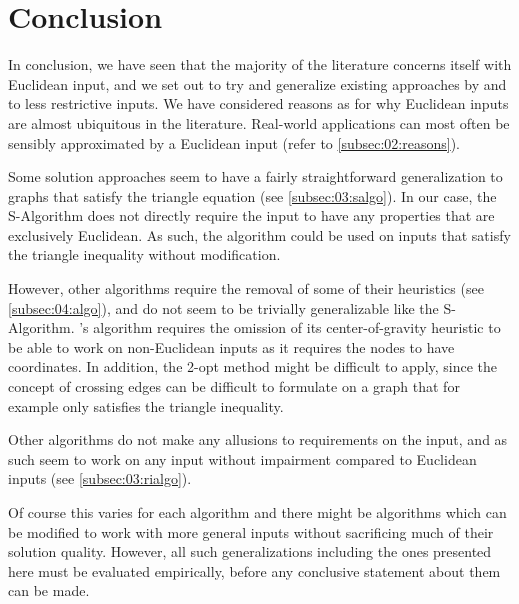 \section{Conclusion}

In conclusion, we have seen that the majority of the literature concerns itself with Euclidean input,
and we set out to try and generalize existing approaches by \citeauthor{tsiligiridis_heuristic_1984} \cite{tsiligiridis_heuristic_1984} and \citeauthor{szwarc_novel_2022} \cite{szwarc_novel_2022} to less restrictive inputs.
We have considered reasons as for why Euclidean inputs are almost ubiquitous in the literature.
Real-world applications can most often be sensibly approximated by a Euclidean input (refer to \cref{subsec:02:reasons}).

Some solution approaches seem to have a fairly straightforward generalization to graphs that satisfy the triangle equation (see \cref{subsec:03:salgo}).
In our case, the S-Algorithm does not directly require the input to have any properties that are exclusively Euclidean.
As such, the algorithm could be used on inputs that satisfy the triangle inequality without modification.

However, other algorithms require the removal of some of their heuristics (see \cref{subsec:04:algo}),
and do not seem to be trivially generalizable like the S-Algorithm.
\citeauthor{szwarc_novel_2022}'s algorithm requires the omission of its center-of-gravity heuristic to be able to work on non-Euclidean inputs as it requires the nodes to have coordinates.
In addition, the 2-opt method might be difficult to apply, since the concept of crossing edges can be difficult to formulate on a graph that for example only satisfies the triangle inequality.

Other algorithms do not make any allusions to requirements on the input, and as such seem to work on any input without impairment compared to Euclidean inputs (see \cref{subsec:03:rialgo}).

Of course this varies for each algorithm and there might be algorithms which can be modified to work with more general inputs without sacrificing much of their solution quality.
However, all such generalizations including the ones presented here must be evaluated empirically, before any conclusive statement about them can be made.

